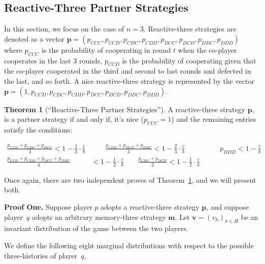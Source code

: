 \documentclass{article}
\theoremstyle{definition}
\newtheorem{theorem}{Theorem}[section]
\begin{document}
\subsection{Reactive-Three Partner Strategies}

In this section, we focus on the case of $n=3$. Reactive-three strategies are
denoted as a vector $\mathbf{p}=(p_{CCC}, p_{CCD}, p_{CDC}, p_{CDD}, p_{DCC},
p_{DCD}, p_{DDC}, p_{DDD})$ where $p_{CCC}$ is the probability of cooperating in
round $t$ when the co-player cooperates in the last 3 rounds, $p_{CCD}$ is the
probability of cooperating given that the co-player cooperated in the third and
second to last rounds and defected in the last, and so forth. A nice
reactive-three strategy is represented by the vector $\mathbf{p}=(1, p_{CCD},
p_{CDC}, p_{CDD}, p_{DCC}, p_{DCD}, p_{DDC}, p_{DDD})$.

\begin{theorem}[``Reactive-Three Partner Strategies'']\label{theorem:reactive_three_partner_strategies}
A reactive-three strategy $\mathbf{p}$, is a partner strategy if and only if,
it's nice ($p_{CCC} = 1$) and the remaining entries satisfy the conditions:

\begin{align}\label{eq:three_bit_conditions}
  \frac{p_{CCD} + p_{CDC} + p_{DCC}}{3} < 1\!-\! \frac{1}{3} \cdot \frac{c}{b} & \qquad 
  \frac{p_{CDD} + p_{DCD} + p_{DDC}}{3} < 1\!-\! \frac{2}{3} \cdot \frac{c}{b} & \qquad 
  p_{DDD} < 1\!-\! \frac{c}{b} \\
  \frac{p_{CCD} + p_{CDD} + p_{DCC} + p_{DDC}}{4}  & < 1\!-\! \frac{1}{2} \cdot \frac{c}{b} 
  \qquad \frac{p_{CDC} + p_{DCD}}{2} < 1\!-\! \frac{1}{2} \cdot \frac{c}{b}
\end{align}
\end{theorem}

Once again, there are two independent proves of
Theorem~\ref{theorem:reactive_three_partner_strategies}, and we will present both.

{\bf Proof One.} Suppose player $p$ adopts a reactive-three strategy
$\mathbf{p}$, and suppose player~$q$ adopts an arbitrary memory-three strategy
$\mathbf{m}$. Let $\mathbf{v}=(v_h)_{h\in H}$ be an invariant distribution of
the game between the two players.

We define the following eight marginal distributions with respect to the possible
three-histories of player~$q$,
\end{document}

